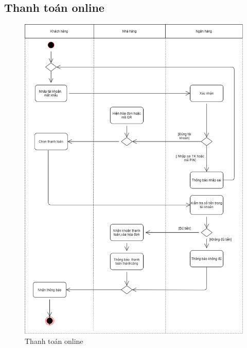 \subsection{Thanh toán online}

\begin{figure}[!h]
    \begin{center}
        \includegraphics[scale=0.4]{Images/ActivityDiagram/payment_activity.png}
    \end{center}
    \hspace{0.3cm}
    \caption{Thanh toán online}
\end{figure}
